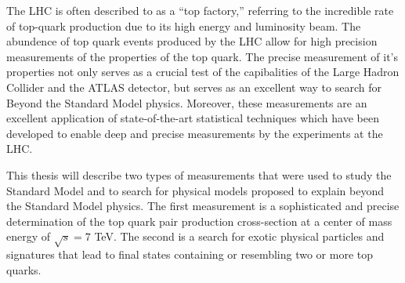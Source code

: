 The LHC is often described to as a ``top factory,'' referring to the incredible rate of top-quark production due to its high energy and luminosity beam.
The abundence of top quark events produced by the LHC allow for high precision measurements of the properties of the top quark.
The precise measurement of it's properties not only serves as a crucial test of the capibalities of the Large Hadron Collider and the ATLAS detector, but serves as an excellent way to search for Beyond the Standard Model physics.
Moreover, these measurements are an excellent application of state-of-the-art statistical techniques which have been developed to enable deep and precise measurements by the experiments at the LHC.

This thesis will describe two types of measurements that were used to study the Standard Model and to search for physical models proposed to explain beyond the Standard Model physics.
The first measurement is a sophisticated and precise determination of the top quark pair production cross-section at a center of mass energy of $\sqrt{s} = 7$ TeV.
The second is a search for exotic physical particles and signatures that lead to final states containing or resembling two or more top quarks.



